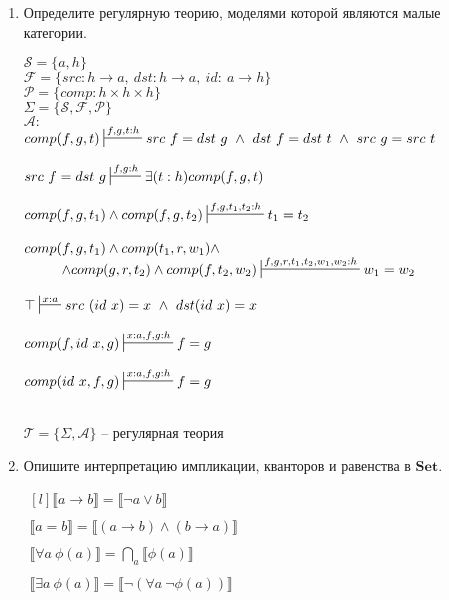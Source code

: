 \documentclass[draft]{article}
\newcommand{\cat}[1]{\mathbf{#1}}
\newcommand{\Set}{\cat{Set}}
\begin{document}
\begin{enumerate}
\newpage
\item Определите регулярную теорию, моделями которой являются малые категории.

$\mathcal{S} = \{a, h\}$\\
$\mathcal{F} = \{src: h \to a, ~ dst: h \to a,~id:~a \to h\}$\\
$\mathcal{P} = \{comp: h\times h \times h\}$\\
$\Sigma = \{\mathcal{S}, \mathcal{F}, \mathcal{P}\}$\\
$\mathcal{A}:$\\
$
\begin{matrix*}[l]
comp(f, g, t) \sststile{}{f,g,t:h} src~f=dst~g ~\land~ dst~f = dst~t~\land~src~g=src~t\\\\
src~f=dst~g  \sststile{}{f,g:h} \exists(t:h)comp(f, g, t)\\\\
comp(f, g, t_1)\land comp(f, g, t_2)  \sststile{}{f,g,t_1,t_2:h} t_1=t_2\\\\
comp(f, g, t_1) \land comp(t_1, r, w_1)\land\\~~~~~~~~\land
comp(g, r, t_2) \land comp(f, t_2, w_2)
 \sststile{}{f,g,r,t_1,t_2,w_1,w_2:h} w_1=w_2\\\\
\top \sststile{}{x:a} src~(id~x)=x ~\land ~dst(id~x) = x\\\\
comp(f, id~x, g) \sststile{}{x:a, f,g:h} f = g  \\\\
comp(id~x, f, g) \sststile{}{x:a, f,g:h} f = g  \\\\
\end{matrix*}
$

$\mathcal{T} = \{\Sigma, \mathcal{A}\}$ -- регулярная теория

\item Опишите интерпретацию импликации, кванторов и равенства в $\Set$.

$
\begin{matrix*}[l]
\llbracket a \to b \rrbracket = \llbracket \neg a \lor b \rrbracket \\\\
\llbracket a = b \rrbracket = \llbracket (a \to b) \land (b \to a)\rrbracket\\\\
\llbracket \forall a~\phi(a) \rrbracket = \bigcap\limits_a \llbracket \phi(a) \rrbracket\\\\
\llbracket \exists a~\phi(a) \rrbracket = \llbracket \neg (\forall a~\neg \phi(a)) \rrbracket
\end{matrix*}
$



\end{enumerate}
\end{document}
